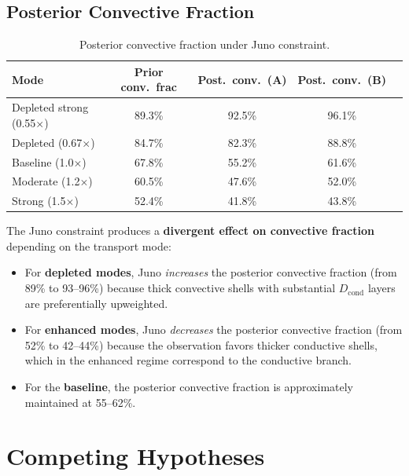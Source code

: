 \documentclass[11pt,letterpaper]{article}
\begin{document}
\subsection{Posterior Convective Fraction}

\begin{table}[htbp]
\centering
\caption{Posterior convective fraction under Juno constraint.}
\label{tab:conv_posterior}
\begin{tabular}{@{}lcccc@{}}
\toprule
\textbf{Mode} & \textbf{Prior conv.\ frac} & \textbf{Post.\ conv.\ (A)} & \textbf{Post.\ conv.\ (B)} \\
\midrule
Depleted strong (0.55$\times$) & 89.3\% & 92.5\% & 96.1\% \\
Depleted (0.67$\times$) & 84.7\% & 82.3\% & 88.8\% \\
Baseline (1.0$\times$) & 67.8\% & 55.2\% & 61.6\% \\
Moderate (1.2$\times$) & 60.5\% & 47.6\% & 52.0\% \\
Strong (1.5$\times$) & 52.4\% & 41.8\% & 43.8\% \\
\bottomrule
\end{tabular}
\end{table}

The Juno constraint produces a \textbf{divergent effect on convective fraction} depending on the transport mode:
\begin{itemize}[nosep]
  \item For \textbf{depleted modes}, Juno \textit{increases} the posterior convective fraction (from 89\% to 93--96\%) because thick convective shells with substantial $D_\mathrm{cond}$ layers are preferentially upweighted.
  \item For \textbf{enhanced modes}, Juno \textit{decreases} the posterior convective fraction (from 52\% to 42--44\%) because the observation favors thicker conductive shells, which in the enhanced regime correspond to the conductive branch.
  \item For the \textbf{baseline}, the posterior convective fraction is approximately maintained at 55--62\%.
\end{itemize}


\section{Competing Hypotheses}
\label{sec:hypotheses}
\end{document}
